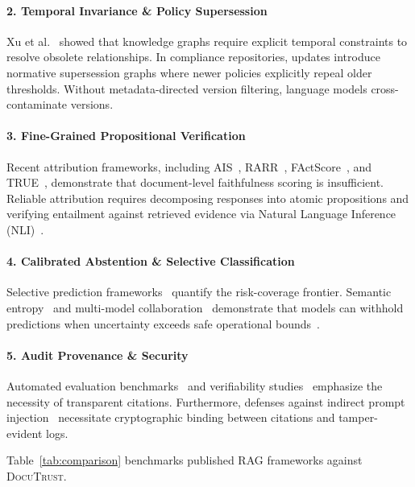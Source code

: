 \documentclass[journal,twoside]{IEEEtran}
\newcommand{\sysname}{\textsc{DocuTrust}}
\begin{document}
\paragraph{2. Temporal Invariance \& Policy Supersession}
Xu et al.~\cite{xu2024temporal} showed that knowledge graphs require explicit temporal constraints to resolve obsolete relationships.
In compliance repositories, updates introduce normative supersession graphs where newer policies explicitly repeal older thresholds.
Without metadata-directed version filtering, language models cross-contaminate versions.

\paragraph{3. Fine-Grained Propositional Verification}
Recent attribution frameworks, including AIS~\cite{rashkin2023ais}, RARR~\cite{gao2023rarr}, FActScore~\cite{min2023factscore}, and TRUE~\cite{honovich2022true}, demonstrate that document-level faithfulness scoring is insufficient.
Reliable attribution requires decomposing responses into atomic propositions and verifying entailment against retrieved evidence via Natural Language Inference (NLI)~\cite{thorne2018fever,bohnet2022aqqa}.

\paragraph{4. Calibrated Abstention \& Selective Classification}
Selective prediction frameworks~\cite{geifman2017selective} quantify the risk-coverage frontier.
Semantic entropy~\cite{kuhn2023entropy} and multi-model collaboration~\cite{feng2024abstain} demonstrate that models can withhold predictions when uncertainty exceeds safe operational bounds~\cite{cole2023abstain}.

\paragraph{5. Audit Provenance \& Security}
Automated evaluation benchmarks~\cite{saadfalcon2024ares,es2023ragas} and verifiability studies~\cite{liu2024verifiability} emphasize the necessity of transparent citations.
Furthermore, defenses against indirect prompt injection~\cite{zhan2024injection} necessitate cryptographic binding between citations and tamper-evident logs.

Table~\ref{tab:comparison} benchmarks published RAG frameworks against \sysname{}.
\end{document}
